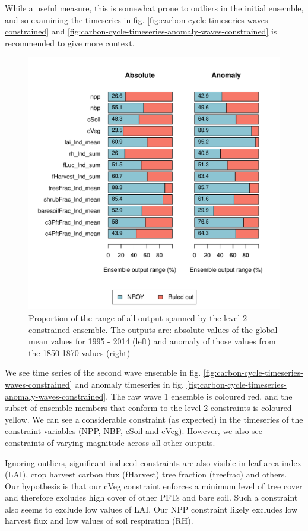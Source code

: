 \documentclass[gmd, manuscript]{copernicus}
\begin{document}
While a useful measure, this is somewhat prone to outliers in the initial ensemble, and so examining the timeseries in fig. \ref{fig:carbon-cycle-timeseries-waves-constrained} and \ref{fig:carbon-cycle-timeseries-anomaly-waves-constrained} is recommended to give more context. 

\begin{figure}[t]
\includegraphics[width=12cm]{./figs/induced_constraint_barplot.pdf}
\caption{Proportion of the range of all output spanned by the level 2-constrained ensemble. The outputs are: absolute values of the global mean values for 1995 - 2014 (left) and anomaly of those values from the 1850-1870 values (right)}
\label{fig:induced_constraint_barplot}
\end{figure}


We see time series of the second wave ensemble in fig. \ref{fig:carbon-cycle-timeseries-waves-constrained} and anomaly timeseries in fig. \ref{fig:carbon-cycle-timeseries-anomaly-waves-constrained}. The raw wave 1 ensemble is coloured red, and the subset of ensemble members that conform to the level 2 constraints is coloured yellow. We can see a considerable constraint (as expected) in the timeseries of the constraint variables (NPP, NBP, cSoil and cVeg). However, we also see constraints of varying magnitude across all other outputs.

Ignoring outliers, significant induced constraints are also visible in leaf area index (LAI), crop harvest carbon flux (fHarvest) tree fraction (treefrac) and others. Our hypothesis is that our cVeg constraint enforces a minimum level of tree cover and therefore excludes high cover of other PFTs and bare soil. Such a constraint also seems to exclude low values of LAI. Our NPP constraint likely excludes low harvest flux and low values of soil respiration (RH).
\end{document}
